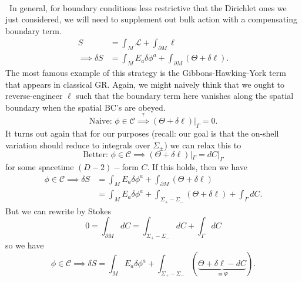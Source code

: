 \documentclass[11pt,letterpaper]{article}
\newcommand{\mc}[1]{\mathcal{#1}}
\newcommand{\D}{\partial}
\begin{document}
\\
\
In general, for boundary conditions less restrictive that the Dirichlet ones we just considered, we will need to supplement out bulk action with a compensating boundary term. \begin{equation}
\begin{aligned}
S & = \int_M \mc{L} + \int_{\D M} \ell \\
\implies \delta S & = \int_M E_a \delta \phi^a + \int_{\D M} (\Theta + \delta \ell).
\end{aligned}
\end{equation}
The most famous example of this strategy is the Gibbons-Hawking-York term that appears in classical GR. Again, we might naively think that we ought to reverse-engineer $\ell$ such that the boundary term here vanishes along the spatial boundary when the spatial BC's are obeyed. \begin{equation}
\mbox{Naive: } \phi \in \mc{C} \stackrel{?}{\implies} (\Theta + \delta \ell)|_{\Gamma} = 0.
\end{equation}
It turns out again that for our purposes (recall: our goal is that the on-shell variation should reduce to integrals over $\Sigma_\pm$) we can relax this to \begin{equation}
\mbox{Better: } \phi \in \mc{C} \implies (\Theta + \delta \ell)|_\Gamma = dC|_\Gamma
\end{equation}
for some spacetime $(D-2)-$form $C$. If this holds, then we have \begin{equation}
\begin{aligned}
\phi \in \mc{C} \implies \delta S & = \int_M E_a \delta \phi^a + \int_{\D M} (\Theta + \delta \ell) \\
& = \int_M E_a \delta \phi^a + \int_{\Sigma_+ - \Sigma_- } (\Theta + \delta \ell) + \int_\Gamma dC.
\end{aligned}
\end{equation}
But we can rewrite by Stokes \begin{equation}
0 = \int_{\D M} d C = \int_{\Sigma_+ - \Sigma_-} d C + \int_\Gamma dC
\end{equation}
so we have \begin{equation}
\phi \in \mc{C} \implies \delta S = \int_M E_a \delta \phi^a + \int_{\Sigma_+ - \Sigma_-} (\underbrace{\Theta + \delta \ell - dC}_{\equiv \Psi}).
\end{equation}
\end{document}
